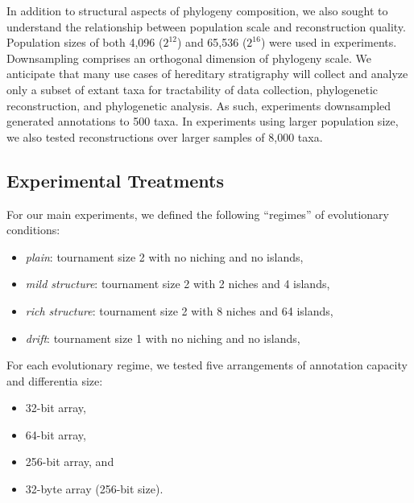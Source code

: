 In addition to structural aspects of phylogeny composition, we also sought to understand the relationship between population scale and reconstruction quality.
Population sizes of both 4,096 ($2^{12}$) and 65,536 ($2^{16}$) were used in experiments.
Downsampling comprises an orthogonal dimension of phylogeny scale.
We anticipate that many use cases of hereditary stratigraphy will collect and analyze only a subset of extant taxa for tractability of data collection, phylogenetic reconstruction, and phylogenetic analysis.
As such, experiments downsampled generated annotations to 500 taxa.
In experiments using larger population size, we also tested reconstructions over larger samples of 8,000 taxa.

\subsection{Experimental Treatments}

For our main experiments, we defined the following ``regimes'' of evolutionary conditions:
\begin{itemize}
  \item \textit{plain}: tournament size 2 with no niching and no islands,
  \item \textit{mild structure}: tournament size 2 with 2 niches and 4 islands,
  \item \textit{rich structure}: tournament size 2 with 8 niches and 64 islands,
  \item \textit{drift}: tournament size 1 with no niching and no islands,
\end{itemize}



For each evolutionary regime, we tested five arrangements of annotation capacity and differentia size:
\begin{itemize}
  \item 32-bit array,
  \item 64-bit array,
  \item 256-bit array, and
  \item 32-byte array (256-bit size).
\end{itemize}

